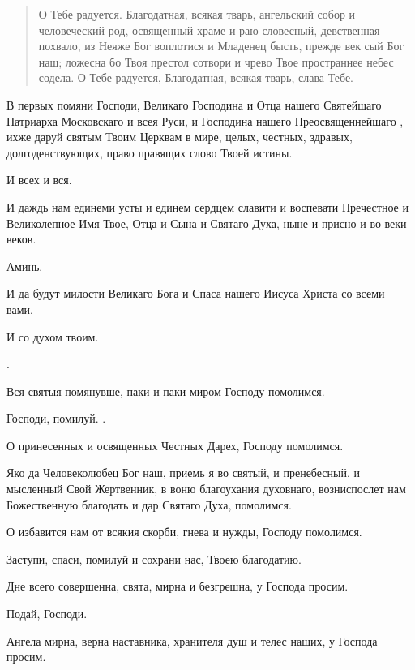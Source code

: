 \begin{mymulticols}
\begin{quote}
О Тебе радуется. Благодатная, всякая тварь, ангельский собор и человеческий род, освященный храме и раю словесный, девственная похвало, из Неяже Бог воплотися и Младенец бысть, прежде век сый Бог наш; ложесна бо Твоя престол сотвори и чрево Твое пространнее небес содела. О Тебе радуется, Благодатная, всякая тварь, слава Тебе.\myemph{ ]}
\end{quote}      

 В первых помяни Господи, Великаго Господина и Отца нашего   Святейшаго Патриарха Московскаго и всея Руси, и Господина нашего Преосвященнейшаго , ихже даруй святым Твоим Церквам в мире, целых, честных, здравых, долгоденствующих, право правящих слово Твоей истины. 

 И всех и вся.

 И даждь нам единеми усты и единем сердцем славити и воспевати Пречестное и Великолепное Имя Твое, Отца и Сына и Святаго Духа, ныне и присно и во веки веков. 

 Аминь.

 И да будут милости Великаго Бога и Спаса нашего Иисуса Христа со всеми вами.

 И со духом твоим.

. 


 Вся святыя помянувше, паки и паки миром Господу помолимся. 

 Господи, помилуй. . 

О принесенных и освященных Честных Дарех, Господу помолимся. 

Яко да Человеколюбец Бог наш, приемь я во святый, и пренебесный, и мысленный Свой Жертвенник, в воню благоухания духовнаго, возниспослет нам Божественную благодать и дар Святаго Духа, помолимся. 

О избавится нам от всякия скорби, гнева и нужды, Господу помолимся. 

Заступи, спаси, помилуй и сохрани нас, Твоею благодатию. 

 Дне всего совершенна, свята, мирна и безгрешна, у Господа просим. 

 Подай, Господи.

 Ангела мирна, верна наставника, хранителя душ и телес наших, у Господа просим. 


\end{mymulticols}

